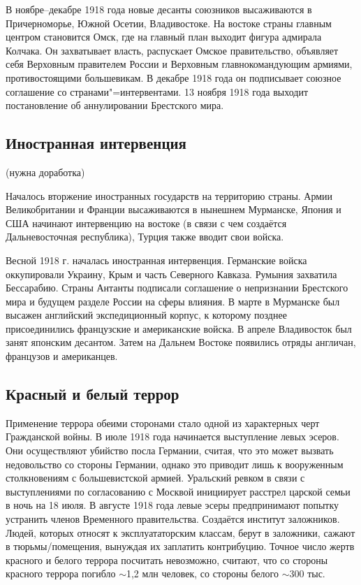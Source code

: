 В ноябре--декабре 1918 года новые десанты союзников высаживаются в Причерноморье, Южной Осетии, Владивостоке.
На востоке страны главным центром становится Омск, где на главный план выходит фигура адмирала Колчака. Он захватывает власть, распускает Омское правительство, объявляет себя Верховным правителем России и Верховным главнокомандующим армиями, противостоящими большевикам. В декабре 1918 года он подписывает союзное соглашение со странами"=интервентами.
13 ноября 1918 года выходит постановление об аннулировании Брестского мира.

\subsection{Иностранная интервенция} (нужна доработка)

Началось вторжение иностранных государств на территорию страны. Армии Великобритании и Франции высаживаются в нынешнем Мурманске, Япония и США начинают интервенцию на востоке (в связи с чем создаётся Дальневосточная республика), Турция также вводит свои войска.

Весной 1918 г. началась иностранная интервенция. Германские войска оккупировали
Украину, Крым и часть Северного Кавказа. Румыния захватила Бессарабию. Страны Антанты
подписали соглашение о непризнании Брестского мира и будущем разделе России на сферы
влияния. В марте в Мурманске был высажен английский экспедиционный корпус, к которому
позднее присоединились французские и американские войска. В апреле Владивосток был занят
японским десантом. Затем на Дальнем Востоке появились отряды англичан, французов и
американцев.

\subsection{Красный и белый террор}

Применение террора обеими сторонами стало одной из характерных черт Гражданской войны.
В июле 1918 года начинается выступление левых эсеров. Они осуществляют убийство посла Германии, считая, что это может вызвать недовольство со стороны Германии, однако это приводит лишь к вооруженным столкновениям с большевистской армией.
Уральский ревком в связи с выступлениями по согласованию с Москвой инициирует расстрел царской семьи в ночь на 18 июля. 
В августе 1918 года левые эсеры предпринимают попытку устранить членов Временного правительства.
Создаётся институт заложников. Людей, которых относят к эксплуататорским классам, берут в заложники, сажают в тюрьмы/помещения, вынуждая их заплатить контрибуцию. 
Точное число жертв красного и белого террора посчитать невозможно, считают, что со стороны красного террора погибло $\sim$1,2 млн человек, со стороны белого $\sim$300 тыс.


